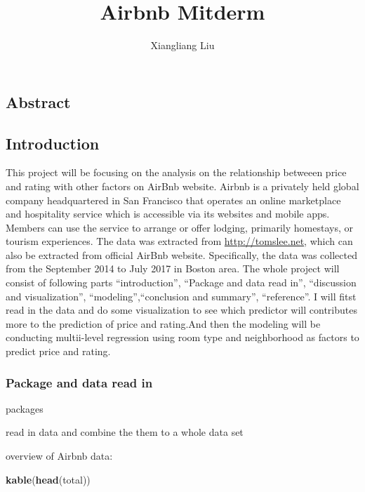 \documentclass[]{article}
\title{Airbnb Mitderm}
\author{Xiangliang Liu}
\date{}
\newenvironment{Shaded}{\begin{snugshade}}{\end{snugshade}}
\newcommand{\KeywordTok}[1]{\textcolor[rgb]{0.13,0.29,0.53}{\textbf{#1}}}
\newcommand{\NormalTok}[1]{#1}
\begin{document}
\maketitle

\subsection{Abstract}\label{abstract}

\subsection{Introduction}\label{introduction}

This project will be focusing on the analysis on the relationship
betweeen price and rating with other factors on AirBnb website. Airbnb
is a privately held global company headquartered in San Francisco that
operates an online marketplace and hospitality service which is
accessible via its websites and mobile apps. Members can use the service
to arrange or offer lodging, primarily homestays, or tourism
experiences. The data was extracted from \url{http://tomslee.net}, which
can also be extracted from official AirBnb website. Specifically, the
data was collected from the September 2014 to July 2017 in Boston area.
The whole project will consist of following parts ``introduction'',
``Package and data read in'', ``discussion and visualization'',
``modeling'',``conclusion and summary'', ``reference''. I will fitst
read in the data and do some visualization to see which predictor will
contributes more to the prediction of price and rating.And then the
modeling will be conducting multii-level regression using room type and
neighborhood as factors to predict price and rating.

\subsubsection{Package and data read in}\label{package-and-data-read-in}

packages

read in data and combine the them to a whole data set

overview of Airbnb data:

\begin{Shaded}
\begin{Highlighting}[]
\KeywordTok{kable}\NormalTok{(}\KeywordTok{head}\NormalTok{(total))}
\end{Highlighting}
\end{Shaded}
\end{document}
